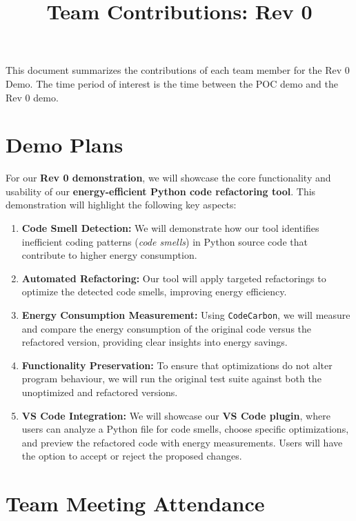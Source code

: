 \documentclass{article}
\title{Team Contributions: Rev 0\\\progname}
\author{\authname}
\date{}
\begin{document}
\maketitle

This document summarizes the contributions of each team member for the Rev 0
Demo.  The time period of interest is the time between the POC demo and the Rev
0 demo.

\section{Demo Plans}

For our \textbf{Rev 0 demonstration}, we will showcase the core functionality and usability of our \textbf{energy-efficient Python code refactoring tool}. This demonstration will highlight the following key aspects:

\begin{enumerate}

    \item \textbf{Code Smell Detection:} We will demonstrate how our tool identifies inefficient coding patterns (\textit{code smells}) in Python source code that contribute to higher energy consumption.
    \item \textbf{Automated Refactoring:} Our tool will apply targeted refactorings to optimize the detected code smells, improving energy efficiency.
    \item \textbf{Energy Consumption Measurement:} Using \texttt{CodeCarbon}, we will measure and compare the energy consumption of the original code versus the refactored version, providing clear insights into energy savings.
    \item \textbf{Functionality Preservation:} To ensure that optimizations do not alter program behaviour, we will run the original test suite against both the unoptimized and refactored versions.
    \item \textbf{VS Code Integration:} We will showcase our \textbf{VS Code plugin}, where users can analyze a Python file for code smells, choose specific optimizations, and preview the refactored code with energy measurements. Users will have the option to accept or reject the proposed changes.

\end{enumerate}

\section{Team Meeting Attendance}
\end{document}
